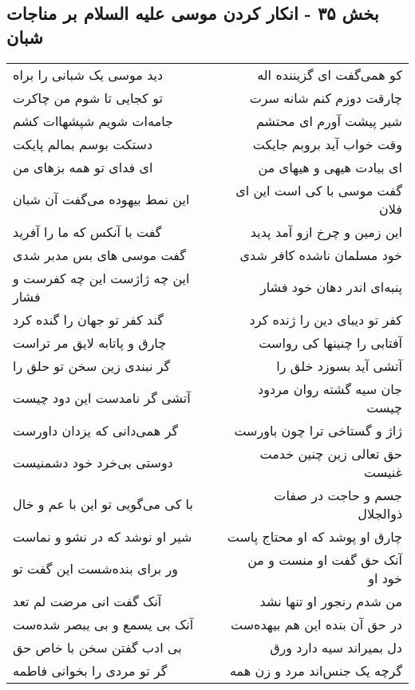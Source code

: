 \begin{center}
\section*{بخش ۳۵ - انکار کردن موسی علیه السلام بر مناجات شبان}
\label{sec:sh035}
\begin{longtable}{l p{0.5cm} r}
دید موسی یک شبانی را براه
&&
کو همی‌گفت ای گزیننده اله
\\
تو کجایی تا شوم من چاکرت
&&
چارقت دوزم کنم شانه سرت
\\
جامه‌ات شویم شپشهاات کشم
&&
شیر پیشت آورم ای محتشم
\\
دستکت بوسم بمالم پایکت
&&
وقت خواب آید بروبم جایکت
\\
ای فدای تو همه بزهای من
&&
ای بیادت هیهی و هیهای من
\\
این نمط بیهوده می‌گفت آن شبان
&&
گفت موسی با کی است این ای فلان
\\
گفت با آنکس که ما را آفرید
&&
این زمین و چرخ ازو آمد پدید
\\
گفت موسی های بس مدبر شدی
&&
خود مسلمان ناشده کافر شدی
\\
این چه ژاژست این چه کفرست و فشار
&&
پنبه‌ای اندر دهان خود فشار
\\
گند کفر تو جهان را گنده کرد
&&
کفر تو دیبای دین را ژنده کرد
\\
چارق و پاتابه لایق مر تراست
&&
آفتابی را چنینها کی رواست
\\
گر نبندی زین سخن تو حلق را
&&
آتشی آید بسوزد خلق را
\\
آتشی گر نامدست این دود چیست
&&
جان سیه گشته روان مردود چیست
\\
گر همی‌دانی که یزدان داورست
&&
ژاژ و گستاخی ترا چون باورست
\\
دوستی بی‌خرد خود دشمنیست
&&
حق تعالی زین چنین خدمت غنیست
\\
با کی می‌گویی تو این با عم و خال
&&
جسم و حاجت در صفات ذوالجلال
\\
شیر او نوشد که در نشو و نماست
&&
چارق او پوشد که او محتاج پاست
\\
ور برای بنده‌شست این گفت تو
&&
آنک حق گفت او منست و من خود او
\\
آنک گفت انی مرضت لم تعد
&&
من شدم رنجور او تنها نشد
\\
آنک بی یسمع و بی یبصر شده‌ست
&&
در حق آن بنده این هم بیهده‌ست
\\
بی ادب گفتن سخن با خاص حق
&&
دل بمیراند سیه دارد ورق
\\
گر تو مردی را بخوانی فاطمه
&&
گرچه یک جنس‌اند مرد و زن همه
\\

\end{longtable}
\end{center}
